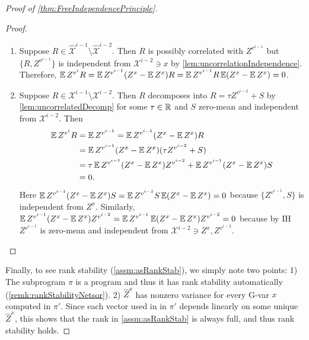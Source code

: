 \documentclass[main.tex]{subfiles}
\begin{document}
\begin{proof}[Proof of \cref{thm:FreeIndependencePrinciple}]
\begin{proof}
\begin{description}
\begin{description}
\begin{enumerate}
\item Suppose $R\in\mathcal{\hat{X}}^{i-1}\setminus\mathcal{\hat{X}}^{i-2}$. Then $R$ is possibly correlated with $Z^{v^{i-1}}$ but $\{R,Z^{v^{i-1}}\}$ is independent from $\mathcal{\mathcal{X}}^{i-2}\ni x$ by \cref{lem:uncorrelationIndependence}. Therefore, $\operatorname*{\mathbb{E}} Z^{v^{i}}R=\operatorname*{\mathbb{E}} Z^{v^{i-1}}(Z^{x}-\operatorname*{\mathbb{E}} Z^{x})R=\operatorname*{\mathbb{E}} Z^{v^{i-1}}R\operatorname*{\mathbb{E}}(Z^{x}-\operatorname*{\mathbb{E}} Z^{x})=0$.
\item Suppose $R\in\mathcal{X}^{i-1}\setminus\mathcal{X}^{i-2}$. Then $R$ decomposes into $R=\tau Z^{v^{i-2}}+S$ by \cref{lem:uncorrelatedDecomp} for some $\tau\in\mathbb{R}$ and $S$ zero-mean and independent from $\mathcal{X}^{i-2}$. Then 
\begin{align*}
\operatorname*{\mathbb{E}} Z^{v^{i}}R & =\operatorname*{\mathbb{E}} Z^{v^{i-1}}=\operatorname*{\mathbb{E}} Z^{v^{i-1}}(Z^{x}-\operatorname*{\mathbb{E}} Z^{x})R\\
 & =\operatorname*{\mathbb{E}} Z^{v^{i-1}}(Z^{x}-\operatorname*{\mathbb{E}} Z^{x})(\tau Z^{v^{i-2}}+S)\\
 & =\tau\operatorname*{\mathbb{E}} Z^{v^{i-1}}(Z^{x}-\operatorname*{\mathbb{E}} Z^{x})Z^{v^{i-2}}+\operatorname*{\mathbb{E}} Z^{v^{i-1}}(Z^{x}-\operatorname*{\mathbb{E}} Z^{x})S\\
 & =0.
\end{align*}
Here $\operatorname*{\mathbb{E}} Z^{v^{i-1}}(Z^{x}-\operatorname*{\mathbb{E}} Z^{x})S=\operatorname*{\mathbb{E}} Z^{v^{i-1}}S\operatorname*{\mathbb{E}}(Z^{x}-\operatorname*{\mathbb{E}} Z^{x})=0$ because $\{Z^{v^{i-1}},S\}$ is independent from $Z^{x}$. Similarly, $\operatorname*{\mathbb{E}} Z^{v^{i-1}}(Z^{x}-\operatorname*{\mathbb{E}} Z^{x})Z^{v^{i-2}}=\operatorname*{\mathbb{E}} Z^{v^{i-1}}\operatorname*{\mathbb{E}}(Z^{x}-\operatorname*{\mathbb{E}} Z^{x})Z^{v^{i-2}}=0$ because by IH $Z^{v^{i-1}}$ is zero-mean and independent from $\mathcal{X}^{i-2}\ni Z^{x},Z^{v^{i-2}}$.
\end{enumerate}
\end{description}
\end{description}
\end{proof}

Finally, to see rank stability (\cref{assm:asRankStab}), we simply note two points: 1) The subprogram $\pi$ is a \netsort{} program and thus it has rank stability automatically (\cref{remk:rankStabilityNetsor}). 2) $\hat Z^x$ has nonzero variance for every G-var $x$ computed in $\pi'$.
Since each vector used in  in $\pi'$ depends linearly on some unique $\hat Z^x$, this shows that the rank in \cref{assm:asRankStab} is always full, and thus rank stability holds.

\end{proof}

    
\end{document}
